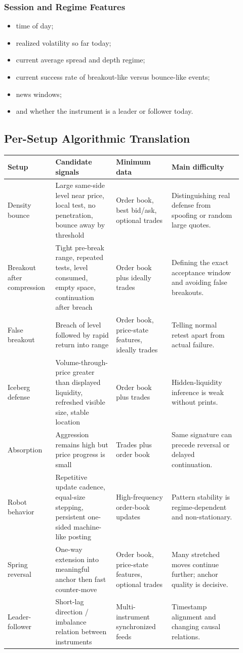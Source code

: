 \subsubsection{Session and Regime Features}
\begin{itemize}
  \item time of day;
  \item realized volatility so far today;
  \item current average spread and depth regime;
  \item current success rate of breakout-like versus bounce-like events;
  \item news windows;
  \item and whether the instrument is a leader or follower today.
\end{itemize}

\subsection{Per-Setup Algorithmic Translation}

\begin{longtable}{p{0.18\linewidth}p{0.24\linewidth}p{0.22\linewidth}p{0.28\linewidth}}
\toprule
\textbf{Setup} & \textbf{Candidate signals} & \textbf{Minimum data} & \textbf{Main difficulty} \\
\midrule
Density bounce & Large same-side level near price, local test, no penetration, bounce away by threshold & Order book, best bid/ask, optional trades & Distinguishing real defense from spoofing or random large quotes. \\
Breakout after compression & Tight pre-break range, repeated tests, level consumed, empty space, continuation after breach & Order book plus ideally trades & Defining the exact acceptance window and avoiding false breakouts. \\
False breakout & Breach of level followed by rapid return into range & Order book, price-state features, ideally trades & Telling normal retest apart from actual failure. \\
Iceberg defense & Volume-through-price greater than displayed liquidity, refreshed visible size, stable location & Order book plus trades & Hidden-liquidity inference is weak without prints. \\
Absorption & Aggression remains high but price progress is small & Trades plus order book & Same signature can precede reversal or delayed continuation. \\
Robot behavior & Repetitive update cadence, equal-size stepping, persistent one-sided machine-like posting & High-frequency order-book updates & Pattern stability is regime-dependent and non-stationary. \\
Spring reversal & One-way extension into meaningful anchor then fast counter-move & Order book, price-state features, optional trades & Many stretched moves continue further; anchor quality is decisive. \\
Leader-follower & Short-lag direction / imbalance relation between instruments & Multi-instrument synchronized feeds & Timestamp alignment and changing causal relations. \\
\bottomrule
\end{longtable}

